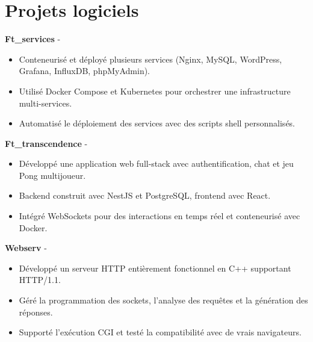 \documentclass[a4paper,11pt]{article}%
\begin{document}
\section*{Projets logiciels}%
%
\noindent \textbf{Ft\_services} - \href{https://github.com/sboof911/ft_services}{{}}%
\begin{itemize}[leftmargin=2em,label={},parsep=0pt,topsep=1em]%
\item Conteneuris\'e et d\'eploy\'e plusieurs services (Nginx, MySQL, WordPress, Grafana, InfluxDB, phpMyAdmin).%
\item Utilis\'e Docker Compose et Kubernetes pour orchestrer une infrastructure multi-services.%
\item Automatis\'e le d\'eploiement des services avec des scripts shell personnalis\'es.%
\end{itemize}%
%
\noindent \textbf{Ft\_transcendence} - \href{https://github.com/sboof911/ft_transcendence}{{}}%
\begin{itemize}[leftmargin=2em,label={},parsep=0pt,topsep=1em]%
\item D\'evelopp\'e une application web full-stack avec authentification, chat et jeu Pong multijoueur.%
\item Backend construit avec NestJS et PostgreSQL, frontend avec React.%
\item Int\'egr\'e WebSockets pour des interactions en temps r\'eel et conteneuris\'e avec Docker.%
\end{itemize}%
%
\noindent \textbf{Webserv} - \href{https://github.com/sboof911/webserv}{{}}%
\begin{itemize}[leftmargin=2em,label={},parsep=0pt,topsep=1em]%
\item D\'evelopp\'e un serveur HTTP enti\`erement fonctionnel en C++ supportant HTTP/1.1.%
\item G\'er\'e la programmation des sockets, l'analyse des requ\^etes et la g\'en\'eration des r\'eponses.%
\item Support\'e l'ex\'ecution CGI et test\'e la compatibilit\'e avec de vrais navigateurs.%
\end{itemize}%
\end{document}

